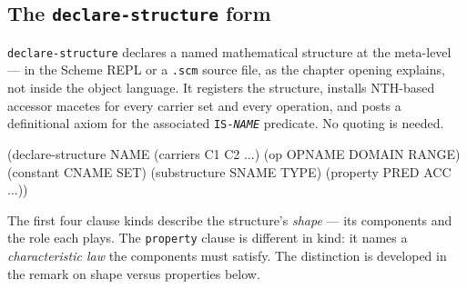 \subsection{The \texttt{declare-structure} form}

\texttt{declare-structure} declares a named mathematical structure at the
meta-level --- in the Scheme REPL or a \texttt{.scm} source file, as the
chapter opening explains, not inside the object language.  It registers
the structure, installs NTH-based accessor
macetes for every carrier set and every operation, and posts a
definitional axiom for the associated \texttt{IS-\textit{NAME}} predicate.
No quoting is needed.

\begin{VNBcode}
(declare-structure NAME
  (carriers C1 C2 ...)
  (op OPNAME DOMAIN RANGE)
  (constant CNAME SET)
  (substructure SNAME TYPE)
  (property PRED ACC ...))
\end{VNBcode}

The first four clause kinds describe the structure's \emph{shape} --- its
components and the role each plays.  The \texttt{property} clause is different in
kind: it names a \emph{characteristic law} the components must satisfy.  The
distinction is developed in the remark on shape versus properties below.

